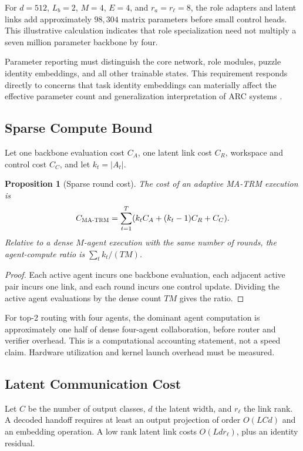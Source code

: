 \documentclass[10pt,a4paper,twocolumn]{article}
\newtheorem{proposition}{Proposition}
\newcommand{\MA}{\textsc{MA-TRM}}
\begin{document}
For $d=512$, $L_b=2$, $M=4$, $E=4$, and $r_a=r_\ell=8$, the role adapters and latent links add approximately $98{,}304$ matrix parameters before small control heads. This illustrative calculation indicates that role specialization need not multiply a seven million parameter backbone by four.

Parameter reporting must distinguish the core network, role modules, puzzle identity embeddings, and all other trainable states. This requirement responds directly to concerns that task identity embeddings can materially affect the effective parameter count and generalization interpretation of ARC systems \cite{royeazar2025trmanalysis}.

\subsection{Sparse Compute Bound}
Let one backbone evaluation cost $C_A$, one latent link cost $C_R$, workspace and control cost $C_C$, and let $k_t=|A_t|$.
\begin{proposition}[Sparse round cost]
The cost of an adaptive \MA{} execution is
\begin{equation}
C_{\MA}=\sum_{t=1}^{T}(k_tC_A+(k_t-1)C_R+C_C). \label{eq:runtime}
\end{equation}
Relative to a dense $M$-agent execution with the same number of rounds, the agent-compute ratio is $\sum_t k_t/(TM)$.
\end{proposition}
\begin{proof}
Each active agent incurs one backbone evaluation, each adjacent active pair incurs one link, and each round incurs one control update. Dividing the active agent evaluations by the dense count $TM$ gives the ratio.
\end{proof}

For top-2 routing with four agents, the dominant agent computation is approximately one half of dense four-agent collaboration, before router and verifier overhead. This is a computational accounting statement, not a speed claim. Hardware utilization and kernel launch overhead must be measured.

\subsection{Latent Communication Cost}
Let $C$ be the number of output classes, $d$ the latent width, and $r_\ell$ the link rank. A decoded handoff requires at least an output projection of order $O(LCd)$ and an embedding operation. A low rank latent link costs $O(Ldr_\ell)$, plus an identity residual.
\end{document}
